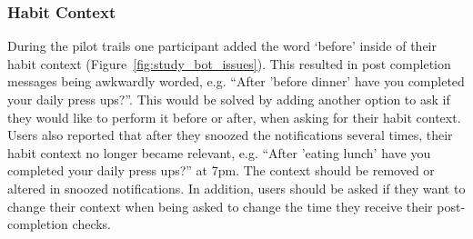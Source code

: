 \subsubsection*{Habit Context}
During the pilot trails one participant added the word `before' inside of their habit context (Figure~\ref{fig:study_bot_issues}). This resulted in post completion messages being awkwardly worded, e.g. ``After 'before dinner' have you completed your daily press ups?''. This would be solved by adding another option to ask if they would like to perform it before or after, when asking for their habit context. Users also reported that after they snoozed the notifications several times, their habit context no longer became relevant, e.g. ``After 'eating lunch' have you completed your daily press ups?'' at 7pm. The context should be removed or altered in snoozed notifications. In addition, users should be asked if they want to change their context when being asked to change the time they receive their post-completion checks.

